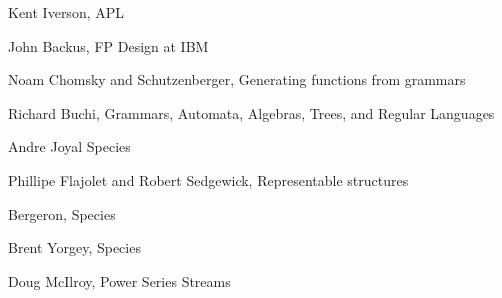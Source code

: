 \documentclass{article}
\begin{document}
Kent Iverson, APL


John Backus, FP Design at IBM


Noam Chomsky and Schutzenberger, Generating functions from grammars


Richard Buchi, Grammars, Automata, Algebras, Trees, and Regular Languages


Andre Joyal Species


Phillipe Flajolet and Robert Sedgewick, Representable structures


Bergeron, Species


Brent Yorgey, Species


Doug McIlroy, Power Series Streams



\nocite{*}


\end{document}

